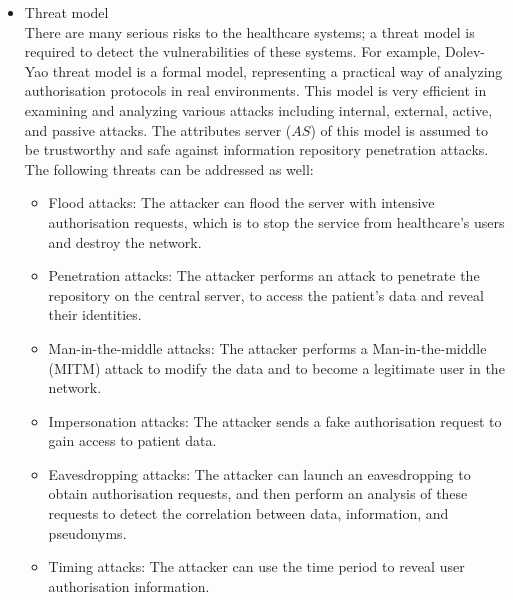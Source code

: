 \documentclass[journal,article,submit,moreauthors,pdftex]{Definitions/mdpi}
\begin{document}
\begin{itemize}
\item Threat model \\
There are many serious risks to the healthcare systems; a threat model is required to detect the
vulnerabilities of these systems. For example, Dolev-Yao threat model \cite{fp32} is a formal model, representing a practical way of analyzing authorisation protocols in real environments. This model
is very efficient in examining and analyzing various attacks including internal, external, active, and passive attacks. The attributes server ($AS$) of this model is assumed to be trustworthy and
safe against information repository penetration attacks. The following threats can be addressed as well:
\begin{itemize}
\item Flood attacks: The attacker can flood the server with intensive authorisation requests, which is to stop the service from healthcare's users and destroy the network.
\item Penetration attacks: The attacker performs an attack to penetrate the repository on the central server, to access the patient's data and reveal their identities.
\item Man-in-the-middle attacks: The attacker performs a Man-in-the-middle (MITM) attack to modify the data and to become a legitimate user in the network.
\item Impersonation attacks: The attacker sends a fake authorisation request to gain access to patient data.
\item Eavesdropping attacks: The attacker can launch an eavesdropping to obtain authorisation requests, and then perform an analysis of these requests to detect the correlation between data, information, and pseudonyms.
\item Timing attacks: The attacker can use the time period to reveal user authorisation information.
\end{itemize}


\end{itemize}
\end{document}
